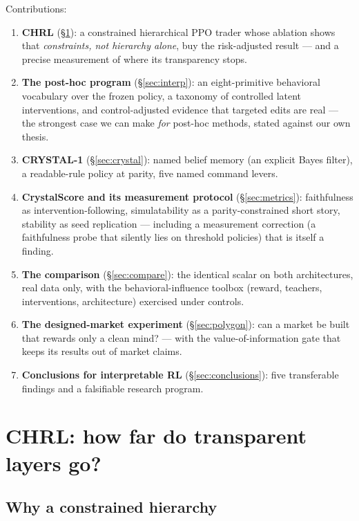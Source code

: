 \documentclass[11pt]{article}
\begin{document}
Contributions:
\begin{enumerate}
  \item \textbf{CHRL} (\S\ref{sec:chrl}): a constrained hierarchical PPO trader whose ablation
        shows that \emph{constraints, not hierarchy alone}, buy the risk-adjusted result ---
        and a precise measurement of where its transparency stops.
  \item \textbf{The post-hoc program} (\S\ref{sec:interp}): an eight-primitive behavioral
        vocabulary over the frozen policy, a taxonomy of controlled latent interventions, and
        control-adjusted evidence that targeted edits are real --- the strongest case we can
        make \emph{for} post-hoc methods, stated against our own thesis.
  \item \textbf{CRYSTAL-1} (\S\ref{sec:crystal}): named belief memory (an explicit Bayes
        filter), a readable-rule policy at parity, five named command levers.
  \item \textbf{CrystalScore and its measurement protocol} (\S\ref{sec:metrics}): faithfulness
        as intervention-following, simulatability as a parity-constrained short story,
        stability as seed replication --- including a measurement correction (a faithfulness
        probe that silently lies on threshold policies) that is itself a finding.
  \item \textbf{The comparison} (\S\ref{sec:compare}): the identical scalar on both
        architectures, real data only, with the behavioral-influence toolbox (reward, teachers,
        interventions, architecture) exercised under controls.
  \item \textbf{The designed-market experiment} (\S\ref{sec:polygon}): can a market be built
        that rewards only a clean mind? --- with the value-of-information gate that keeps its
        results out of market claims.
  \item \textbf{Conclusions for interpretable RL} (\S\ref{sec:conclusions}): five
        transferable findings and a falsifiable research program.
\end{enumerate}

\section{CHRL: how far do transparent layers go?}
\label{sec:chrl}

\subsection{Why a constrained hierarchy}
\label{sec:chrlwhy}
\end{document}
